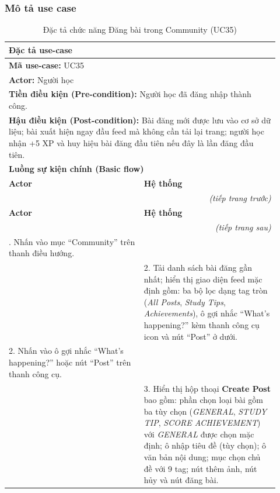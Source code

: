 \subsubsection{Mô tả use case}
\renewcommand{\arraystretch}{1.3}
\begin{longtable}{|p{0.46\linewidth}|p{0.46\linewidth}|}
    \caption{Đặc tả chức năng Đăng bài trong Community (UC35)} \label{tab:uc35_spec} \\
    \hline
    \multicolumn{2}{|l|}{\textbf{Đặc tả use-case}} \\ \hline
    \multicolumn{2}{|l|}{\textbf{Mã use-case:} UC35} \\ \hline
    \multicolumn{2}{|l|}{\textbf{Actor:} Người học} \\ \hline
    \multicolumn{2}{|p{0.88\linewidth}|}{\textbf{Tiền điều kiện (Pre-condition):} Người học đã đăng nhập thành công.} \\ \hline
    \multicolumn{2}{|p{0.88\linewidth}|}{\textbf{Hậu điều kiện (Post-condition):} Bài đăng mới được lưu vào cơ sở dữ liệu; bài xuất hiện ngay đầu feed mà không cần tải lại trang; người học nhận +5 XP và huy hiệu bài đăng đầu tiên nếu đây là lần đăng đầu tiên.} \\ \hline
    \multicolumn{2}{|l|}{\textbf{Luồng sự kiện chính (Basic flow)}} \\ \hline
    \textbf{Actor} & \textbf{Hệ thống} \\ \hline
    \endfirsthead
    \multicolumn{2}{r}{\textit{(tiếp trang trước)}} \\
    \hline
    \textbf{Actor} & \textbf{Hệ thống} \\ \hline
    \endhead
    \hline
    \multicolumn{2}{r}{\textit{(tiếp trang sau)}} \\
    \endfoot
    \hline
    \endlastfoot
    1. Nhấn vào mục ``Community'' trên thanh điều hướng. & \\ \hline
    & 2. Tải danh sách bài đăng gần nhất; hiển thị giao diện feed mặc định gồm: ba bộ lọc dạng tag tròn (\textit{All Posts}, \textit{Study Tips}, \textit{Achievements}), ô gợi nhắc ``What's happening?'' kèm thanh công cụ icon và nút ``Post'' ở dưới. \\ \hline
    2. Nhấn vào ô gợi nhắc ``What's happening?'' hoặc nút ``Post'' trên thanh công cụ. & \\ \hline
    & 3. Hiển thị hộp thoại \textbf{Create Post} bao gồm: phần chọn loại bài gồm ba tùy chọn (\textit{GENERAL}, \textit{STUDY TIP}, \textit{SCORE ACHIEVEMENT}) với \textit{GENERAL} được chọn mặc định; ô nhập tiêu đề (tùy chọn); ô văn bản nội dung; mục chọn chủ đề với 9 tag; nút thêm ảnh, nút hủy và nút đăng bài. \\ \hline

\end{longtable}
